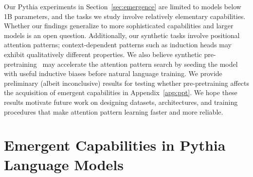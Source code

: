\documentclass{article}
\begin{document}
Our Pythia experiments in Section~\ref{sec:emergence} are limited to models below 1B parameters, and the tasks we study involve relatively elementary capabilities. Whether our findings generalize to more sophisticated capabilities and larger models is an open question. Additionally, our synthetic tasks involve positional attention patterns; context-dependent patterns such as induction heads may exhibit qualitatively different properties. We also believe synthetic pre-pretraining~\citep{hu2025circuitschomskyprepretrainingformal, lee2026traininglanguagemodelsneural} may accelerate the attention pattern search by seeding the model with useful inductive biases before natural language training. We provide preliminary (albeit inconclusive) results for testing whether pre-pretraining affects the acquisition of emergent capabilities in Appendix~\ref{app:ppt}. We hope these results motivate future work on designing datasets, architectures, and training procedures that make attention pattern learning faster and more reliable.









\newpage
\appendix

\section{Emergent Capabilities in Pythia Language Models}
\label{app:causal}
\end{document}
